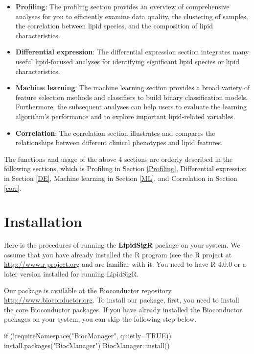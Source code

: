 \documentclass[]{article}
\providecommand{\tightlist}{%
  \setlength{\itemsep}{0pt}\setlength{\parskip}{0pt}}
\newcommand{\hlstr}[1]{\textcolor[rgb]{0.251,0.627,0.251}{#1}}%
\newcommand{\hlopt}[1]{\textcolor[rgb]{0,0,0}{#1}}%
\newcommand{\hlstd}[1]{\textcolor[rgb]{0.251,0.251,0.251}{#1}}%
\newcommand{\hlkwc}[1]{\textcolor[rgb]{0.251,0.251,0.251}{#1}}%
\newcommand{\hlkwd}[1]{\textcolor[rgb]{0.878,0.439,0.125}{#1}}%
\newenvironment{Shaded}{\begin{myshaded}}{\end{myshaded}}
\newcommand{\KeywordTok}[1]{\hlkwd{#1}}
\newcommand{\DataTypeTok}[1]{\hlkwc{#1}}
\newcommand{\StringTok}[1]{\hlstr{#1}}
\newcommand{\OtherTok}[1]{{#1}}
\newcommand{\ControlFlowTok}[1]{\hlkwd{#1}}
\newcommand{\OperatorTok}[1]{\hlopt{#1}}
\newcommand{\NormalTok}[1]{\hlstd{#1}}
\begin{document}
\begin{itemize}
\tightlist
\item
  \textbf{Profiling}: The profiling section provides an overview of comprehensive analyses for you to efficiently examine data quality, the clustering of samples, the correlation between lipid species, and the composition of lipid characteristics.
\item
  \textbf{Differential expression}: The differential expression section integrates many useful lipid-focused analyses for identifying significant lipid species or lipid characteristics.
\item
  \textbf{Machine learning}: The machine learning section provides a broad variety of feature selection methods and classifiers to build binary classification models. Furthermore, the subsequent analyses can help users to evaluate the learning algorithm's performance and to explore important lipid-related variables.
\item
  \textbf{Correlation}: The correlation section illustrates and compares the relationships between different clinical phenotypes and lipid features.
\end{itemize}

The functions and usage of the above 4 sections are orderly described in the following sections, which is Profiling in Section \ref{Profiling}, Differential expression in Section \ref{DE}, Machine learning in Section \ref{ML}, and Correlation in Section \ref{corr}.

\hypertarget{installation}{%
\section*{Installation}\label{installation}}

Here is the procedures of running the \textbf{LipidSigR} package on your system. We assume that you have already installed the R program (see the R project at \url{http://www.r-project.org} and are familiar with it. You need to have R 4.0.0 or a later version installed for running LipidSigR.

Our package is available at the Bioconductor repository \url{http://www.bioconductor.org}. To install our package, first, you need to install the core Bioconductor packages. If you have already installed the Bioconductor packages on your system, you can skip the following step below.

\begin{Shaded}
\begin{Highlighting}[]
\ControlFlowTok{if}\NormalTok{ (}\OperatorTok{!}\KeywordTok{requireNamespace}\NormalTok{(}\StringTok{"BiocManager"}\NormalTok{, }\DataTypeTok{quietly=}\OtherTok{TRUE}\NormalTok{))}
    \KeywordTok{install.packages}\NormalTok{(}\StringTok{"BiocManager"}\NormalTok{)}
\NormalTok{BiocManager}\OperatorTok{::}\KeywordTok{install}\NormalTok{()}
\end{Highlighting}
\end{Shaded}
\end{document}
